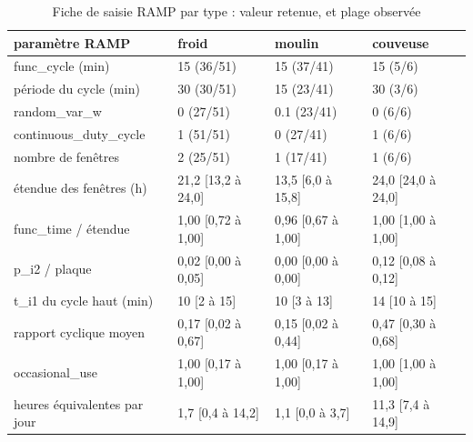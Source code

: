 \begin{table}[htbp]
\caption{Fiche de saisie RAMP par type : valeur retenue, et plage observée}
\label{tab:type_fiche}
\begin{tabular}{llll}
\toprule
paramètre RAMP & froid & moulin & couveuse \\
\midrule
func\_cycle (min) & 15 (36/51) & 15 (37/41) & 15 (5/6) \\
période du cycle (min) & 30 (30/51) & 15 (23/41) & 30 (3/6) \\
random\_var\_w & 0 (27/51) & 0.1 (23/41) & 0 (6/6) \\
continuous\_duty\_cycle & 1 (51/51) & 0 (27/41) & 1 (6/6) \\
nombre de fenêtres & 2 (25/51) & 1 (17/41) & 1 (6/6) \\
étendue des fenêtres (h) & 21,2  [13,2 à 24,0] & 13,5  [6,0 à 15,8] & 24,0  [24,0 à 24,0] \\
func\_time / étendue & 1,00  [0,72 à 1,00] & 0,96  [0,67 à 1,00] & 1,00  [1,00 à 1,00] \\
p\_i2 / plaque & 0,02  [0,00 à 0,05] & 0,00  [0,00 à 0,00] & 0,12  [0,08 à 0,12] \\
t\_i1 du cycle haut (min) & 10  [2 à 15] & 10  [3 à 13] & 14  [10 à 15] \\
rapport cyclique moyen & 0,17  [0,02 à 0,67] & 0,15  [0,02 à 0,44] & 0,47  [0,30 à 0,68] \\
occasional\_use & 1,00  [0,17 à 1,00] & 1,00  [0,17 à 1,00] & 1,00  [1,00 à 1,00] \\
heures équivalentes par jour & 1,7  [0,4 à 14,2] & 1,1  [0,0 à 3,7] & 11,3  [7,4 à 14,9] \\
\bottomrule
\end{tabular}
\end{table}
